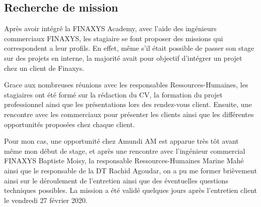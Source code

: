 \subsection{Recherche de mission}
\par Après avoir intégré la FINAXYS Academy, avec l'aide des ingénieurs commerciaux FINAXYS, les stagiaire se font proposer des missions qui correspondent a leur profils. En effet, même s’il était possible de passer son stage sur des projets en interne, la majorité avait pour objectif d’intégrer un projet chez un client de Finaxys.
\par Grace aux nombreuses réunions avec les responsables Ressources-Humaines, les stagiaires ont été formé sur la rédaction du CV, la formation du projet professionnel ainsi que les présentations lors des rendez-vous client. Ensuite, une rencontre avec les commerciaux pour présenter les clients ainsi que les différentes opportunités proposées chez chaque client.
\par Pour mon cas, une opportunité chez Amundi AM est apparue très tôt avant même mon début de stage, et après une rencontre avec l'ingénieur commercial FINAXYS Baptiste Moisy, la responsable Ressources-Humaines Marine Mahé ainsi que le responsable de la DT Rachid Agoudar, on a pu me former brièvement ainsi sur le déroulement de l'entretien ainsi que des éventuelles questions techniques possibles. La mission a été validé quelques jours après l'entretien client le vendredi 27 février 2020. 

